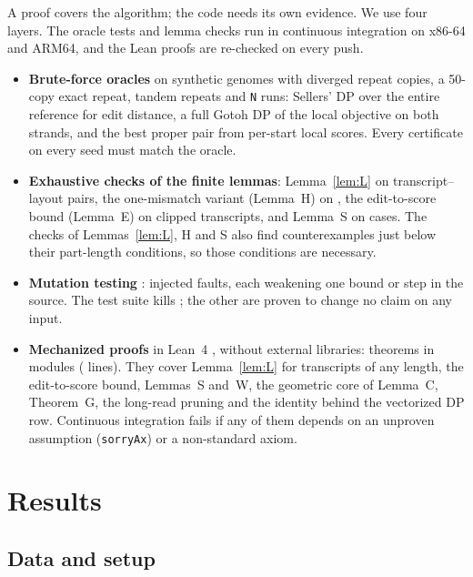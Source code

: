 \documentclass[11pt]{article}
\theoremstyle{definition}
\begin{document}
A proof covers the algorithm; the code needs its own evidence. We use four
layers. The oracle tests and lemma checks run in continuous integration on
x86-64 and ARM64, and the Lean proofs are re-checked on every push.
\begin{itemize}
\item \textbf{Brute-force oracles} on synthetic genomes with diverged
  repeat copies, a 50-copy exact repeat, tandem repeats and \texttt{N}
  runs: Sellers' DP \citep{sellers1980} over the entire reference for edit
  distance, a full Gotoh DP of the local objective on both strands, and the
  best proper pair from per-start local scores. Every certificate on every
  seed must match the oracle.
\item \textbf{Exhaustive checks of the finite lemmas}: Lemma~\ref{lem:L} on
  \VlL{} transcript--layout pairs, the one-mismatch variant (Lemma~H) on
  \VlH{}, the edit-to-score bound (Lemma~E) on \VlE{} clipped transcripts,
  and Lemma~S on \VlS{} cases. The checks of Lemmas~\ref{lem:L}, H and S
  also find counterexamples just below their part-length conditions, so
  those conditions are necessary.
\item \textbf{Mutation testing} \citep{jia2011mutation}: \MutTotal{}
  injected faults, each weakening one bound or step in the source. The
  test suite kills \MutKilled; the other \MutEquiv{} are proven to change
  no claim on any input.
\item \textbf{Mechanized proofs} in Lean~4 \citep{demoura2021lean4},
  without external libraries: \LeanTheorems{} theorems in
  \LeanModules{} modules (\LeanLines{} lines). They cover
  Lemma~\ref{lem:L} for transcripts of any length, the edit-to-score bound,
  Lemmas~S and~W, the geometric core of Lemma~C, Theorem~G, the long-read
  pruning and the identity behind the vectorized DP row. Continuous
  integration fails if any of them depends on an unproven assumption
  (\texttt{sorryAx}) or a non-standard axiom.
\end{itemize}

\section{Results}

\subsection{Data and setup}
\end{document}
